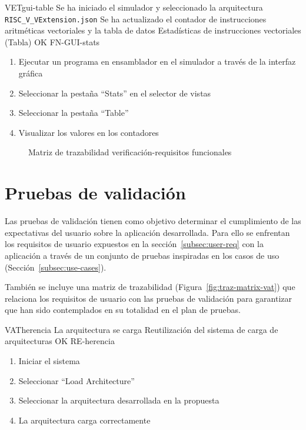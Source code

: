 \begin{testCase}{VET}{gui-table}
    {Se ha iniciado el simulador y seleccionado la arquitectura \texttt{RISC\_V\_VExtension.json}}
    {Se ha actualizado el contador de instrucciones aritméticas vectoriales y la tabla de datos}
    {Estadísticas de instrucciones vectoriales (Tabla)} %
    {OK} %
    {FN-GUI-stats}
    \begin{enumerate}
        \item Ejecutar un programa en ensamblador en el simulador a través de la interfaz gráfica
        \item Seleccionar la pestaña ``Stats'' en el selector de vistas
        \item Seleccionar la pestaña ``Table''
        \item Visualizar los valores en los contadores
    \end{enumerate}
\end{testCase}

{\FloatBarrier}
\begin{figure}
    {}
    \caption{Matriz de trazabilidad verificación-requisitos funcionales}\label{fig:traz-matrix-vet}
\end{figure}

{\FloatBarrier}
\section{Pruebas de validación}\label{sec:validation}

Las pruebas de validación tienen como objetivo determinar el cumplimiento de las expectativas del usuario sobre la aplicación desarrollada. Para ello se enfrentan los requisitos de usuario expuestos en la sección~\ref{subsec:user-req} con la aplicación a través de un conjunto de pruebas inspiradas en los casos de uso (Sección~\ref{subsec:use-cases}).

También se incluye una matriz de trazabilidad (Figura~\ref{fig:traz-matrix-vat}) que relaciona los requisitos de usuario con las pruebas de validación para garantizar que han sido contemplados en su totalidad en el plan de pruebas.

\begin{testCase}{VAT}{herencia}
    {\NA}
    {La arquitectura se carga}
    {Reutilización del sistema de carga de arquitecturas}
    {OK} %
    {RE-herencia}
    \begin{enumerate}
        \item Iniciar el sistema
        \item Seleccionar ``Load Architecture''
        \item Seleccionar la arquitectura desarrollada en la propuesta
        \item La arquitectura carga correctamente
    \end{enumerate}
\end{testCase}

